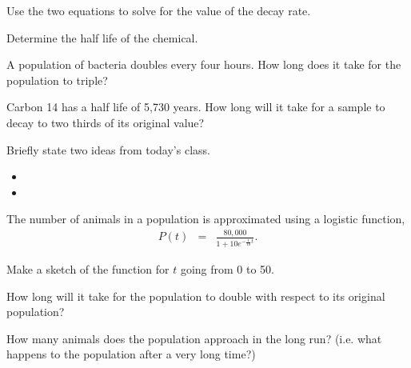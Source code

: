 \begin{problem}
\begin{subproblem}
\begin{subsubproblem}
    \item Use the two equations to solve for the value of the decay rate.
      \vfill
      \vfill

    \item Determine the half life of the chemical.
      \vfill
    \end{subsubproblem}

    
  \end{subproblem}

\clearpage

\item A population of bacteria doubles every four hours. How long does
  it take for the population to triple?
  \vfill

\clearpage

\item Carbon 14 has a half life of 5,730 years. How long will it take
  for a sample to decay to two thirds of its original value?
  \vfill
\clearpage



\end{problem}

\postClass

\begin{problem}
\item Briefly state two ideas from today's class.
  \begin{itemize}
  \item
  \item
  \end{itemize}
\item The number of animals in a population is approximated using a
  logistic function,
  \begin{eqnarray*}
    P(t) & = & \frac{80,000}{1+10e^{-\frac{1}{10}t}}.
  \end{eqnarray*}
  \begin{subproblem}
  \item Make a sketch of the function for $t$ going from 0 to 50.
  \item How long will it take for the population to double with
    respect to its original population?
  \item How many animals does the population approach in the long run?
    (i.e. what happens to the population after a very long time?)
  \end{subproblem}
\end{problem}



